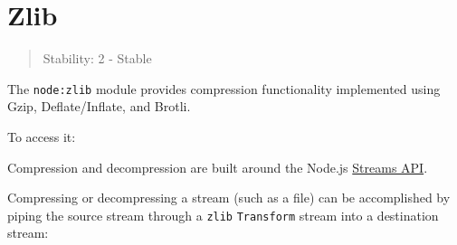 \section{Zlib}\label{zlib}

\begin{quote}
Stability: 2 - Stable
\end{quote}

The \texttt{node:zlib} module provides compression functionality
implemented using Gzip, Deflate/Inflate, and Brotli.

To access it:

\begin{Shaded}
\begin{Highlighting}[]
\OperatorTok{=} \NormalTok{(}\NormalTok{)}\OperatorTok{;}
\end{Highlighting}
\end{Shaded}

Compression and decompression are built around the Node.js
\href{stream.md}{Streams API}.

Compressing or decompressing a stream (such as a file) can be
accomplished by piping the source stream through a \texttt{zlib}
\texttt{Transform} stream into a destination stream:

